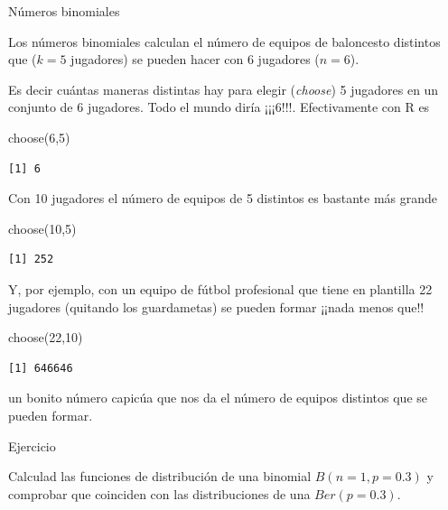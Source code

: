 \documentclass[
  letterpaper,
  DIV=11,
  numbers=noendperiod]{scrreprt}
\newenvironment{Shaded}{\begin{snugshade}}{\end{snugshade}}
\newcommand{\DecValTok}[1]{\textcolor[rgb]{0.68,0.00,0.00}{#1}}
\newcommand{\FunctionTok}[1]{\textcolor[rgb]{0.28,0.35,0.67}{#1}}
\newcommand{\NormalTok}[1]{\textcolor[rgb]{0.00,0.23,0.31}{#1}}
\begin{document}
\begin{Ejemplo}{Números binomiales}{}

Los números binomiales calculan el número de equipos de baloncesto
distintos que (\(k=5\) jugadores) se pueden hacer con 6 jugadores
(\(n=6\)).

Es decir cuántas maneras distintas hay para elegir (\emph{choose}) 5
jugadores en un conjunto de 6 jugadores. Todo el mundo diría ¡¡¡6!!!.
Efectivamente con R es

\begin{Shaded}
\begin{Highlighting}[]
\FunctionTok{choose}\NormalTok{(}\DecValTok{6}\NormalTok{,}\DecValTok{5}\NormalTok{)}
\end{Highlighting}
\end{Shaded}

\begin{verbatim}
[1] 6
\end{verbatim}

Con 10 jugadores el número de equipos de 5 distintos es bastante más
grande

\begin{Shaded}
\begin{Highlighting}[]
\FunctionTok{choose}\NormalTok{(}\DecValTok{10}\NormalTok{,}\DecValTok{5}\NormalTok{)}
\end{Highlighting}
\end{Shaded}

\begin{verbatim}
[1] 252
\end{verbatim}

Y, por ejemplo, con un equipo de fútbol profesional que tiene en
plantilla 22 jugadores (quitando los guardametas) se pueden formar
¡¡nada menos que!!

\begin{Shaded}
\begin{Highlighting}[]
\FunctionTok{choose}\NormalTok{(}\DecValTok{22}\NormalTok{,}\DecValTok{10}\NormalTok{)}
\end{Highlighting}
\end{Shaded}

\begin{verbatim}
[1] 646646
\end{verbatim}

un bonito número capicúa que nos da el número de equipos distintos que
se pueden formar.

\end{Ejemplo}

\begin{Ejercicio}{Ejercicio}{}

Calculad las funciones de distribución de una binomial \(B(n=1,p=0.3)\)
y comprobar que coinciden con las distribuciones de una \(Ber(p=0.3)\).

\end{Ejercicio}
\end{document}
